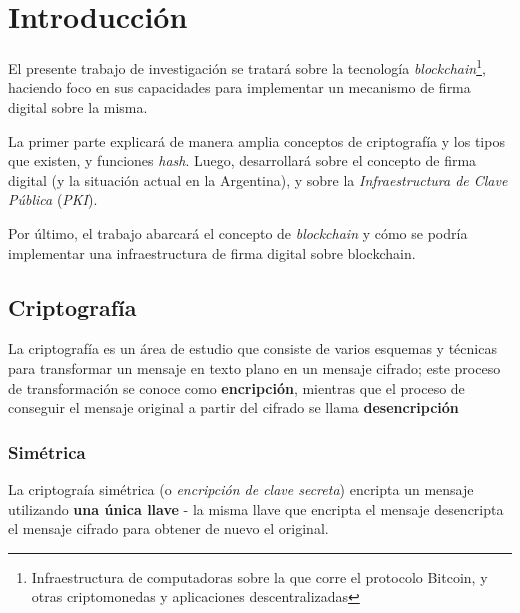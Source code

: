 







\clearpage
\tableofcontents
\clearpage 

\lstset{style=bashstyle}

\section{Introducción}

El presente trabajo de investigación se tratará sobre la tecnología \emph{blockchain}\footnote{Infraestructura de computadoras sobre la que corre el protocolo Bitcoin, y otras criptomonedas y aplicaciones descentralizadas}, haciendo foco en sus capacidades para implementar un mecanismo de firma digital sobre la misma.

La primer parte explicará de manera amplia conceptos de criptografía y los tipos que existen, y funciones \emph{hash}. Luego, desarrollará sobre el concepto de firma digital (y la situación actual en la Argentina), y sobre la \emph{Infraestructura de Clave Pública} (\emph{PKI}).

Por último, el trabajo abarcará el concepto de \emph{blockchain} y cómo se podría implementar una infraestructura de firma digital sobre blockchain.

\subsection{Criptografía}

La criptografía es un área de estudio que consiste de varios esquemas y técnicas para transformar un mensaje en texto plano en un mensaje cifrado; este proceso de transformación se conoce como \textbf{encripción}, mientras que el proceso de conseguir el mensaje original a partir del cifrado se llama \textbf{desencripción} \autocite{StallingsCryptography}

\subsubsection{Simétrica}

La criptograía simétrica (o \emph{encripción de clave secreta}) encripta un mensaje utilizando \textbf{una única llave} - la misma llave que encripta el mensaje desencripta el mensaje cifrado para obtener de nuevo el original. 

